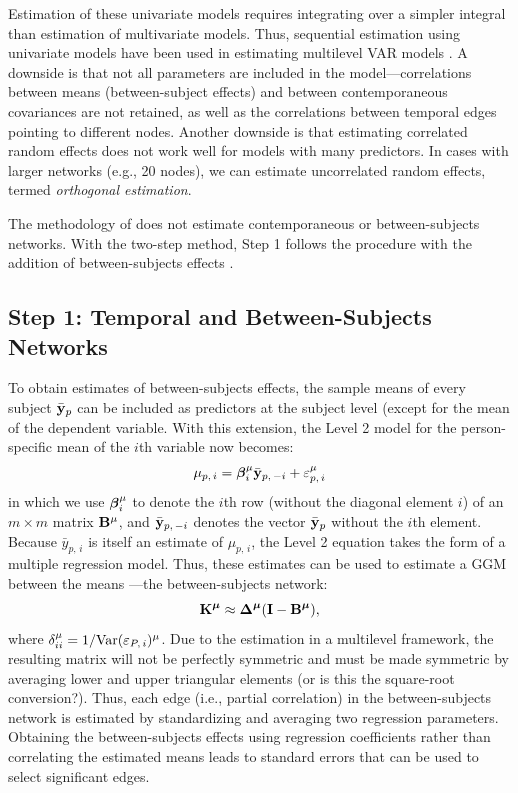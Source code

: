 Estimation of these univariate models requires integrating over a simpler integral than estimation of multivariate models. Thus, sequential estimation using univariate models have been used in estimating multilevel VAR models \cite{bringmann2013network}. A downside is that not all parameters are included in the model---correlations between means (between-subject effects) and between contemporaneous covariances are not retained, as well as the correlations between temporal edges pointing to different nodes. Another downside is that estimating correlated random effects does not work well for models with many predictors. In cases with larger networks (e.g., 20 nodes), we can estimate uncorrelated random effects, termed \textit{orthogonal estimation}. 

The methodology of \cite{bringmann2013network} does not estimate contemporaneous or between-subjects networks. With the two-step method, Step 1 follows the procedure \cite{bringmann2013network} with the addition of between-subjects effects \cite{hamaker2015center}.

\subsection{Step 1: Temporal and Between-Subjects Networks}
To obtain estimates of between-subjects effects, the sample means of every subject $\bar{\mathbf{y}}_p$ can be included as predictors at the subject level (except for the mean of the dependent variable. With this extension, the Level 2 model for the person-specific mean of the $i$th variable now becomes:
\begin{equation}
    \mu_{p,\,i} = \bm{\beta}_i^\mu \bar{\mathbf{y}}_{p,\,-i} + \varepsilon_{p,\,i}^\mu
\end{equation}
in which we use $\bm{\beta}_i^\mu$ to denote the $i$th row (without the diagonal element $i$) of an $m \times m$ matrix $\mathbf{B}^\mu$, and $\bar{\mathbf{y}}_{p,\,-i}$ denotes the vector $\bar{\mathbf{y}}_p$ without the $i$th element. Because $\bar{y}_{p,\,i}$ is itself an estimate of $\mu_{p,\,i}$, the Level 2 equation takes the form of a multiple regression model. Thus, these estimates can be used to estimate a GGM between the means \cite{lauritzen1996graphical,meinshausen2006high}---the between-subjects network:
\begin{equation}
    \mathbf{K}^{\bm{\mu}} \approx \bm{\Delta}^{\bm{\mu}} (\mathbf{I} - \mathbf{B}^{\bm{\mu}}),
\end{equation}
where $\delta_{ii}^\mu = 1/\text{Var}(\varepsilon_{P,\,i})^\mu$. Due to the estimation in a multilevel framework, the resulting matrix will not be perfectly symmetric and must be made symmetric by averaging lower and upper triangular elements (or is this the square-root conversion?). Thus, each edge (i.e., partial correlation) in the between-subjects network is estimated by standardizing and averaging two regression parameters. Obtaining the between-subjects effects using regression coefficients rather than correlating the estimated means leads to standard errors that can be used to select significant edges. 
